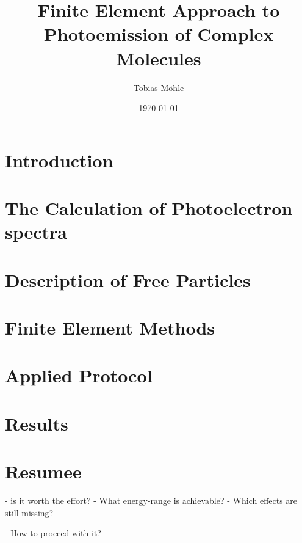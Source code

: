 \documentclass[12pt,a4paper,oneside]{book}
\author{Tobias M\"ohle}
\date{\today }
\title{Finite Element Approach to Photoemission of Complex Molecules}
\begin{document}
\indent
\pagestyle{plain}
\parindent6mm
\setlength{\parskip}{0mm}
\renewcommand{\vec}{\bm}
\newcommand{\mat}[1]{\mathbb{#1}}
\newcommand{\prog}[1]{\texttt{#1}}
\frontmatter
\maketitle
\tableofcontents
\newpage

\mainmatter
\chapter{Introduction} %


\chapter{The Calculation of Photoelectron spectra}


\chapter{Description of Free Particles} 


\chapter{Finite Element Methods}


\chapter{Applied Protocol}


\chapter{Results}


\chapter{Resumee}
 - is it worth the effort?
 - What energy-range is achievable?
 - Which effects are still missing?

 - How to proceed with it?
\end{document}
